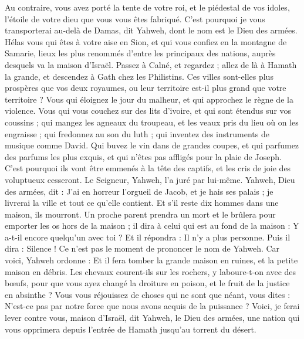 \begin{multicols}{2}
Au contraire, vous avez porté la tente de votre roi, et le piédestal de vos idoles, l'étoile de votre dieu que vous vous êtes fabriqué.
C'est pourquoi je vous transporterai au-delà de Damas, dit Yahweh, dont le nom est le Dieu des armées.
\VerseOne{}Hélas vous qui êtes à votre aise en Sion, et qui vous confiez en la montagne de Samarie, lieux les plus renommés d’entre les principaux des nations, auprès desquels va la maison d'Israël.
Passez à Calné, et regardez ; allez de là à Hamath la grande, et descendez à Gath chez les Philistins. Ces villes sont-elles plus prospères que vos deux royaumes, ou leur territoire est-il plus grand que votre territoire ?
Vous qui éloignez le jour du malheur, et qui approchez le règne de la violence.
Vous qui vous couchez sur des lits d'ivoire, et qui sont étendus sur vos coussins ; qui mangez les agneaux du troupeau, et les veaux pris du lieu où on les engraisse ;
qui fredonnez au son du luth ; qui inventez des instruments de musique comme David.
Qui buvez le vin dans de grandes coupes, et qui parfumez des parfums les plus exquis, et qui n’êtes pas affligés pour la plaie de Joseph.
C’est pourquoi ils vont être emmenés à la tête des captifs, et les cris de joie des voluptueux cesseront.
Le Seigneur, Yahweh, l’a juré par lui-même. Yahweh, Dieu des armées, dit : J'ai en horreur l'orgueil de Jacob, et je hais ses palais ; je livrerai la ville et tout ce qu’elle contient.
Et s'il reste dix hommes dans une maison, ils mourront.
Un proche parent prendra un mort et le brûlera pour emporter les os hors de la maison ; il dira à celui qui est au fond de la maison : Y a-t-il encore quelqu'un avec toi ? Et il répondra : Il n’y a plus personne. Puis il dira : Silence ! Ce n’est pas le moment de prononcer le nom de Yahweh.
Car voici, Yahweh ordonne : Et il fera tomber la grande maison en ruines, et la petite maison en débris.
Les chevaux courent-ils sur les rochers, y laboure-t-on avec des bœufs, pour que vous ayez changé la droiture en poison, et le fruit de la justice en absinthe ?
Vous vous réjouissez de choses qui ne sont que néant, vous dites : N’est-ce pas par notre force que nous avons acquis de la puissance ?
Voici, je ferai lever contre vous, maison d’Israël, dit Yahweh, le Dieu des armées, une nation qui vous opprimera depuis l'entrée de Hamath jusqu'au torrent du désert.

\end{multicols}
